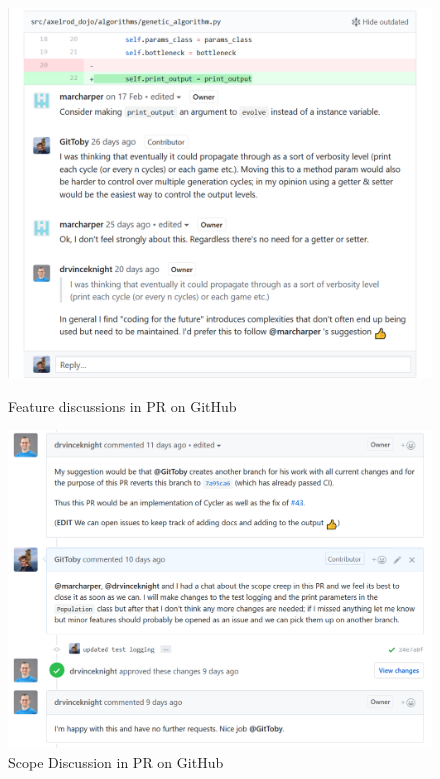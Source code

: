 \begin{figure}[ht]
    \centering
    \begin{minipage}{0.48\textwidth}
        \centering
        \includegraphics[width=1.0\textwidth, center,keepaspectratio]{./img/vcs/feature-discussion.png}
        \caption{Feature discussions in PR on GitHub}\label{fig:PR-discussion}
    \end{minipage}\hfill
    \begin{minipage}{0.48\textwidth}
        \centering
        \includegraphics[width=1.0\textwidth, center,keepaspectratio]{./img/vcs/scope-discussion.png}    
    \caption{Scope Discussion in PR on GitHub}\label{fig:PR-scope-discussion}
    \end{minipage}
\end{figure}

